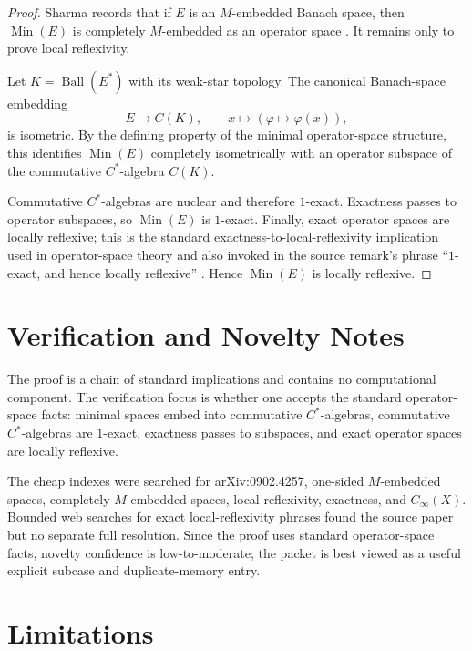 \documentclass[11pt]{article}
\begin{document}
\begin{proof}
Sharma records that if \(E\) is an \(M\)-embedded Banach space, then
\(\operatorname{Min}(E)\) is completely \(M\)-embedded as an operator space
\cite[Section 2]{Sharma2009}.  It remains only to prove local reflexivity.

Let \(K=\operatorname{Ball}(E^*)\) with its weak-star topology.  The canonical
Banach-space embedding
\[
  E \longrightarrow C(K), \qquad x\mapsto (\varphi\mapsto \varphi(x)),
\]
is isometric.  By the defining property of the minimal operator-space
structure, this identifies \(\operatorname{Min}(E)\) completely isometrically
with an operator subspace of the commutative \(C^*\)-algebra \(C(K)\).

Commutative \(C^*\)-algebras are nuclear and therefore \(1\)-exact.  Exactness
passes to operator subspaces, so \(\operatorname{Min}(E)\) is \(1\)-exact.
Finally, exact operator spaces are locally reflexive; this is the standard
exactness-to-local-reflexivity implication used in operator-space theory and
also invoked in the source remark's phrase ``\(1\)-exact, and hence locally
reflexive'' \cite[p.~12]{Sharma2009}.  Hence \(\operatorname{Min}(E)\) is
locally reflexive.
\end{proof}

\section*{Verification and Novelty Notes}

The proof is a chain of standard implications and contains no computational
component.  The verification focus is whether one accepts the standard
operator-space facts: minimal spaces embed into commutative \(C^*\)-algebras,
commutative \(C^*\)-algebras are \(1\)-exact, exactness passes to subspaces,
and exact operator spaces are locally reflexive.

The cheap indexes were searched for arXiv:0902.4257, one-sided
\(M\)-embedded spaces, completely \(M\)-embedded spaces, local reflexivity,
exactness, and \(C_\infty(X)\).
Bounded web searches for exact local-reflexivity phrases found the source
paper but no separate full resolution.  Since the proof uses standard
operator-space facts, novelty confidence is low-to-moderate; the packet is best
viewed as a useful explicit subcase and duplicate-memory entry.

\section*{Limitations}
\end{document}
